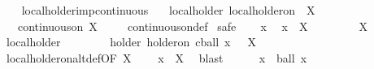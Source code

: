 \begin{isabellebody}
\ \ \isamarkupfalse%
%
\endisatagproof
{\isafoldproof}%
%
\isadelimproof
%
\endisadelimproof
\isanewline
\isanewline
{}\isamarkupfalse%
\ local{\isacharunderscore}{\kern0pt}holder{\isacharunderscore}{\kern0pt}imp{\isacharunderscore}{\kern0pt}continuous{\isacharcolon}{\kern0pt}\isanewline
\ \ \ local{\isacharunderscore}{\kern0pt}holder{\isacharcolon}{\kern0pt}\ {\isachardoublequoteopen}local{\isacharunderscore}{\kern0pt}holder{\isacharunderscore}{\kern0pt}on\ {\isasymgamma}\ X\ {\isasymphi}{\isachardoublequoteclose}\isanewline
\ \ \ {\isachardoublequoteopen}continuous{\isacharunderscore}{\kern0pt}on\ X\ {\isasymphi}{\isachardoublequoteclose}\isanewline
%
\isadelimproof
\ \ %
\endisadelimproof
%
\isatagproof
{}\isamarkupfalse%
\ continuous{\isacharunderscore}{\kern0pt}on{\isacharunderscore}{\kern0pt}def\isanewline
{}\isamarkupfalse%
\ safe\isanewline
\ \ \isamarkupfalse%
\ x\ \isamarkupfalse%
\ {\isachardoublequoteopen}x\ {\isasymin}\ X{\isachardoublequoteclose}\isanewline
\ \ \isacommand{{\isacharbraceleft}{\kern0pt}}\isamarkupfalse%
\isanewline
\ \ \ \ \isamarkupfalse%
\ {\isachardoublequoteopen}X\ {\isasymnoteq}\ {\isacharbraceleft}{\kern0pt}{\isacharbraceright}{\kern0pt}{\isachardoublequoteclose}\isanewline
\ \ \ \ \isamarkupfalse%
\ local{\isacharunderscore}{\kern0pt}holder\ \isamarkupfalse%
\ {\isasymepsilon}\ \ {\isachardoublequoteopen}{}\ {\isacharless}{\kern0pt}\ {\isasymepsilon}{\isachardoublequoteclose}\ \ holder{\isacharcolon}{\kern0pt}\ {\isachardoublequoteopen}{\isasymgamma}{\isacharminus}{\kern0pt}holder{\isacharunderscore}{\kern0pt}on\ {\isacharparenleft}{\kern0pt}{\isacharparenleft}{\kern0pt}cball\ x\ {\isasymepsilon}{\isacharparenright}{\kern0pt}\ {\isasyminter}\ X{\isacharparenright}{\kern0pt}\ {\isasymphi}{\isachardoublequoteclose}\isanewline
\ \ \ \ \ \ \isamarkupfalse%
\ local{\isacharunderscore}{\kern0pt}holder{\isacharunderscore}{\kern0pt}on{\isacharunderscore}{\kern0pt}altdef{\isacharbrackleft}{\kern0pt}OF\ {\isacartoucheopen}X\ {\isasymnoteq}\ {\isacharbraceleft}{\kern0pt}{\isacharbraceright}{\kern0pt}{\isacartoucheclose}{\isacharbrackright}{\kern0pt}\ \isamarkupfalse%
\ {\isacartoucheopen}x\ {\isasymin}\ X{\isacartoucheclose}\ \isamarkupfalse%
\ blast\isanewline
\ \ \ \ \isamarkupfalse%
\ {\isachardoublequoteopen}x\ {\isasymin}\ ball\ x\ {\isasymepsilon}{\isachardoublequoteclose}\ \isamarkupfalse%

\end{isabellebody}
